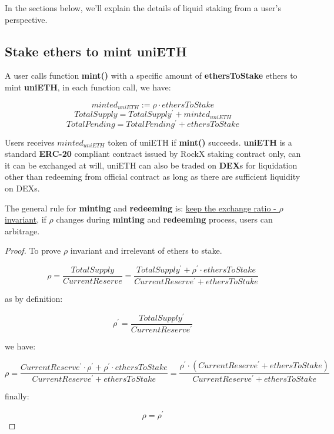 \documentclass{article}
\begin{document}
In the sections below, we'll explain the details of liquid staking from a user's perspective.

\subsection{Stake ethers to mint uniETH}
A user calls function \textbf{mint()} with a specific amount of \textbf{ethersToStake} ethers to mint \textbf{uniETH}, in each function call, we have:

\begin{theorem}
\label{Mint}
\[minted_{uniETH} := \rho \cdot ethersToStake \]
\[TotalSupply = TotalSupply^{\prime} + minted_{uniETH} \]
\[TotalPending = TotalPending^{\prime} + ethersToStake\]
\end{theorem}

Users receives \underline{$minted_{uniETH}$} token of uniETH  if \textbf{mint()} succeeds. \textbf{uniETH} is a standard \textbf{ERC-20} compliant contract issued by RockX staking contract only, can it can be exchanged at will, uniETH can also be traded on \textbf{DEX}s for liquidation other than redeeming from official contract as long as there are sufficient liquidity on DEXs.

The general rule for \textbf{minting} and \textbf{redeeming} is: \underline{keep the exchange ratio - $\rho$ invariant}, if $\rho$ changes during \textbf{minting} and \textbf{redeeming} process, users can arbitrage.

\begin{proof}
To prove $\rho$ invariant and irrelevant of ethers to stake.

\[\rho = \frac{TotalSupply}{CurrentReserve} = \frac{TotalSupply^{\prime} + \rho^{\prime} \cdot ethersToStake}{CurrentReserve^{\prime} + ethersToStake} \]

as by definition:

\[\rho^{\prime} = \frac{TotalSupply^{\prime}}{CurrentReserve^{\prime}}\]

we have:

\[\rho=\frac{CurrentReserve^{\prime} \cdot \rho^{\prime}  + \rho^{\prime} \cdot ethersToStake}{CurrentReserve^{\prime} + ethersToStake} = \frac{\rho^{\prime} \cdot (CurrentReserve^{\prime} + ethersToStake)}{CurrentReserve^{\prime} + ethersToStake} \]

finally:

\[\rho = \rho^{\prime}\]

\end{proof}
\end{document}
